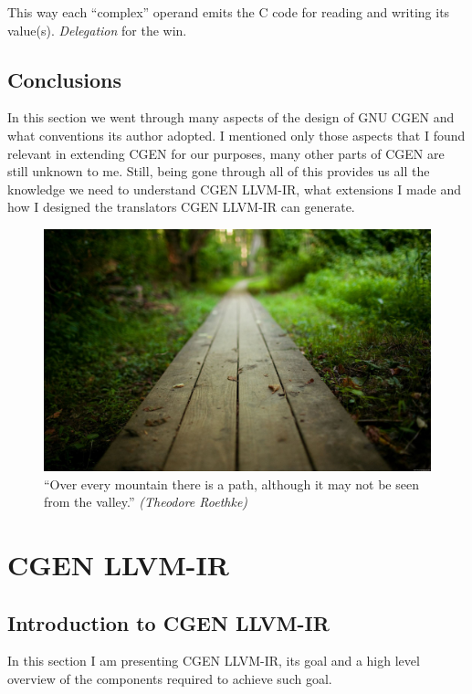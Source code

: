 \documentclass{article}
\begin{document}
This way each ``complex'' operand emits the C code for reading and writing its value(s). \emph{Delegation} for the win.

\subsection{Conclusions}
In this section we went through many aspects of the design of GNU CGEN and what conventions its author adopted. I mentioned only those aspects that I found relevant in extending CGEN for our purposes, many other parts of CGEN are still unknown to me. Still, being gone through all of this provides us all the knowledge we need to understand CGEN LLVM-IR, what extensions I made and how I designed the translators CGEN LLVM-IR can generate.
\vfill

\begin{figure}[H]
  \centering
    \includegraphics[width=1.0\textwidth]{path_2}
  \caption{``Over every mountain there is a path, although it may not be seen from the valley.'' \emph{(Theodore Roethke)}}
  \label{fig:gull}
\end{figure}
\clearpage
\section{CGEN LLVM-IR} \label{sec:cgen-llvm-ir}
\subsection{Introduction to CGEN LLVM-IR}
In this section I am presenting CGEN LLVM-IR, its goal and a high level overview of the components required to achieve such goal.
\end{document}
